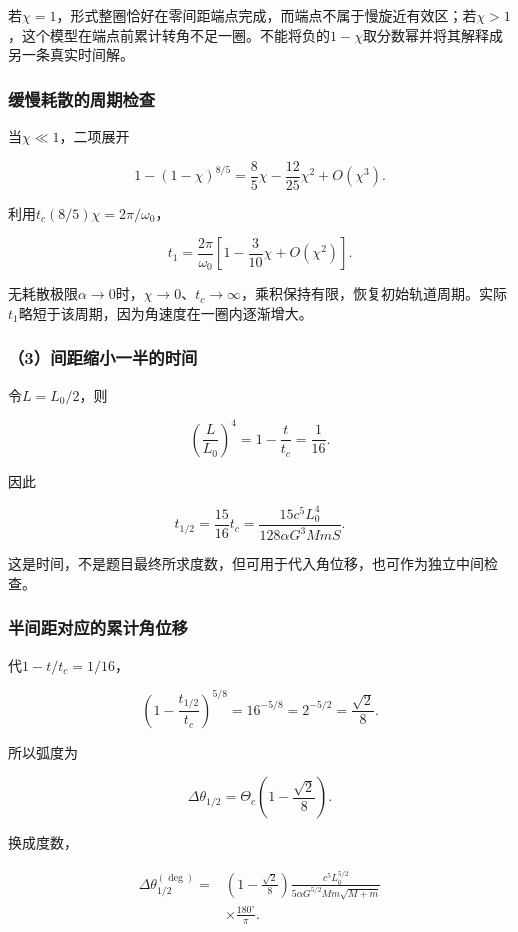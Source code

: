 \documentclass[12pt,a4paper,fontset=fandol]{ctexart}
\begin{document}
若\(\chi=1\)，形式整圈恰好在零间距端点完成，而端点不属于慢旋近有效区；若\(\chi>1\)，这个模型在端点前累计转角不足一圈。不能将负的\(1-\chi\)取分数幂并将其解释成另一条真实时间解。

\subsubsection{缓慢耗散的周期检查}\label{ux7f13ux6162ux8017ux6563ux7684ux5468ux671fux68c0ux67e5}

当\(\chi\ll1\)，二项展开

\[
1-(1-\chi)^{8/5}
=\frac85\chi-\frac{12}{25}\chi^2+O(\chi^3).
\]

利用\(t_c(8/5)\chi=2\pi/\omega_0\)，

\[
\boxed{
t_1=\frac{2\pi}{\omega_0}
\left[1-\frac3{10}\chi+O(\chi^2)\right]}.
\]

无耗散极限\(\alpha\to0\)时，\(\chi\to0\)、\(t_c\to\infty\)，乘积保持有限，恢复初始轨道周期。实际\(t_1\)略短于该周期，因为角速度在一圈内逐渐增大。

\subsubsection{（3）间距缩小一半的时间}\label{ux95f4ux8dddux7f29ux5c0fux4e00ux534aux7684ux65f6ux95f4}

令\(L=L_0/2\)，则

\[
\left(\frac L{L_0}\right)^4
=1-\frac t{t_c}=\frac1{16}.
\]

因此

\[
\boxed{
t_{1/2}=\frac{15}{16}t_c
=\frac{15c^5L_0^4}
{128\alpha G^3MmS}}.
\]

这是时间，不是题目最终所求度数，但可用于代入角位移，也可作为独立中间检查。

\subsubsection{半间距对应的累计角位移}\label{ux534aux95f4ux8dddux5bf9ux5e94ux7684ux7d2fux8ba1ux89d2ux4f4dux79fb}

代\(1-t/t_c=1/16\)，

\[
\left(1-\frac{t_{1/2}}{t_c}\right)^{5/8}
=16^{-5/8}=2^{-5/2}=\frac{\sqrt2}{8}.
\]

所以弧度为

\[
\boxed{
\Delta\theta_{1/2}
=\Theta_c\left(1-\frac{\sqrt2}{8}\right)}.
\]

换成度数，

\[
\boxed{
\begin{aligned}
\Delta\theta_{1/2}^{(\deg)}
={}&\left(1-\frac{\sqrt2}{8}\right)
\frac{c^5L_0^{5/2}}
{5\alpha G^{5/2}Mm\sqrt{M+m}}\\
&\times\frac{180^\circ}{\pi}.
\end{aligned}}
\]
\end{document}
